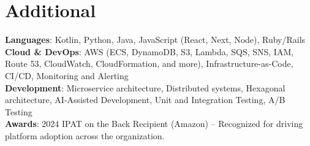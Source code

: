 \documentclass[letterpaper,11pt]{article}
\begin{document}
\section{Additional}
 \begin{itemize}[leftmargin=0.15in, label={}]
    \small{\item{
     \textbf{Languages}{: Kotlin, Python, Java, JavaScript (React, Next, Node), Ruby/Rails} \\[4pt]
     \textbf{Cloud \& DevOps}{: AWS (ECS, DynamoDB, S3, Lambda, SQS, SNS, IAM, Route 53, CloudWatch, CloudFormation, and more), Infrastructure-as-Code, CI/CD, Monitoring and Alerting} \\[4pt]
     \textbf{Development}{: Microservice architecture, Distributed systems, Hexagonal architecture, AI-Assisted Development, Unit and Integration Testing, A/B Testing} \\[4pt]
     \textbf{Awards}{: 2024 IPAT on the Back Recipient (Amazon) -- Recognized for driving platform adoption across the organization.}
    }}
 \end{itemize}

\end{document}
